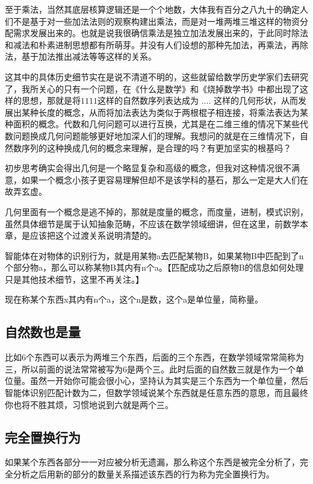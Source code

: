 \documentclass[12pt,oneside]{book}
\begin{document}
至于乘法，当然其底层核算逻辑还是一个个地数，大体我有百分之八九十的确定人们不是基于对一些加法法则的观察构建出乘法，而是对一堆两堆三堆这样的物资分配需求发展出来的。也就是说我很确信乘法是独立加法发展出来的，于此同时除法和减法和朴素进制思想都有所萌芽。并没有人们设想的那种先加法，再乘法，再除法，基于加法推出减法等等这样的关系。

这其中的具体历史细节实在是说不清道不明的，这些就留给数学历史学家们去研究了，我所关心的只有一个问题，在《什么是数学》和《烧掉数学书》中都出现了这样的思想，那就是将$1 1 1 1$这样的自然数序列表达成为 $. . . .$ 这样的几何形状，从而发展出某种长度的概念，从而将加法表达为类似于两根棍子相连接，将乘法表达为某种面积的概念。代数和几何问题可以进行互换，尤其是在二维三维的情况下某些代数问题换成几何问题能够更好地加深人们的理解。我想问的就是在三维情况下，自然数序列的这种换成几何的概念来理解，是合理的吗？有更加坚实的根基吗？

初步思考确实会得出几何是一个略显复杂和高级的概念，但我对这种情况很不满意，如果一个概念小孩子更容易理解但却不是该学科的基石，那么一定是大人们在故弄玄虚。

几何里面有一个概念是逃不掉的，那就是度量的概念，而度量，进制，模式识别，虽然具体细节是属于认知抽象范畴，不应该在数学领域细讲，但在这里，前数学本章，是应该把这个过渡关系说明清楚的。

智能体在对物体的识别行为，就是用某物a去匹配某物B，如果某物B中匹配到了n个部分物a，那么可以称某物B其内有n个a。【匹配成功之后原物B的信息如何处理只是其他技术细节，这里不再关注。】

现在称某个东西x其内有n个a，这个n是数，这个a是单位量，简称量。



\subsection{自然数也是量}
比如6个东西可以表示为两堆三个东西，后面的三个东西，在数学领域常常简称为三，所以前面的说法常常被写为6是两个三。此时后面的自然数三就是作为一个单位量。虽然一开始你可能会很小心，坚持认为其实是三个东西为一个单位量，然后智能体识别匹配计数为二，但数学领域说某个东西就是任意东西的意思，而且最终你也将不胜其烦，习惯地说到六就是两个三。


\subsection{完全置换行为}
如果某个东西各部分一一对应被分析无遗漏，那么称这个东西是被完全分析了，完全分析之后用新的部分的数量关系描述该东西的行为称为完全置换行为。
\end{document}
